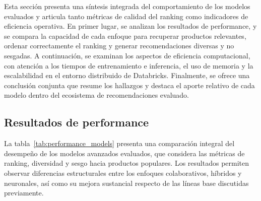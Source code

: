 Esta sección presenta una síntesis integrada del comportamiento de los modelos evaluados y articula tanto métricas de calidad del ranking como indicadores de eficiencia operativa.
En primer lugar, se analizan los resultados de performance, y se compara la capacidad de cada enfoque para recuperar productos relevantes, ordenar correctamente el ranking y generar recomendaciones diversas y no sesgadas.
A continuación, se examinan los aspectos de eficiencia computacional, con atención a los tiempos de entrenamiento e inferencia, el uso de memoria y la escalabilidad en el entorno distribuido de Databricks.
Finalmente, se ofrece una conclusión conjunta que resume los hallazgos y destaca el aporte relativo de cada modelo dentro del ecosistema de recomendaciones evaluado.

\subsection{Resultados de performance}

La tabla~\ref{tab:performance_models} presenta una comparación integral del desempeño de los modelos avanzados evaluados, que considera las métricas de ranking, diversidad y sesgo hacia productos populares. Los resultados permiten observar diferencias estructurales entre los enfoques colaborativos, híbridos y neuronales, así como su mejora sustancial respecto de las líneas base discutidas previamente.

\begin{table}[H]
    \centering
    \caption[Desempeño comparado de los modelos avanzados]{Resumen comparativo demétricas de performance promedio para los modelos evaluados.}
    \label{tab:performance_models}
\end{table}


